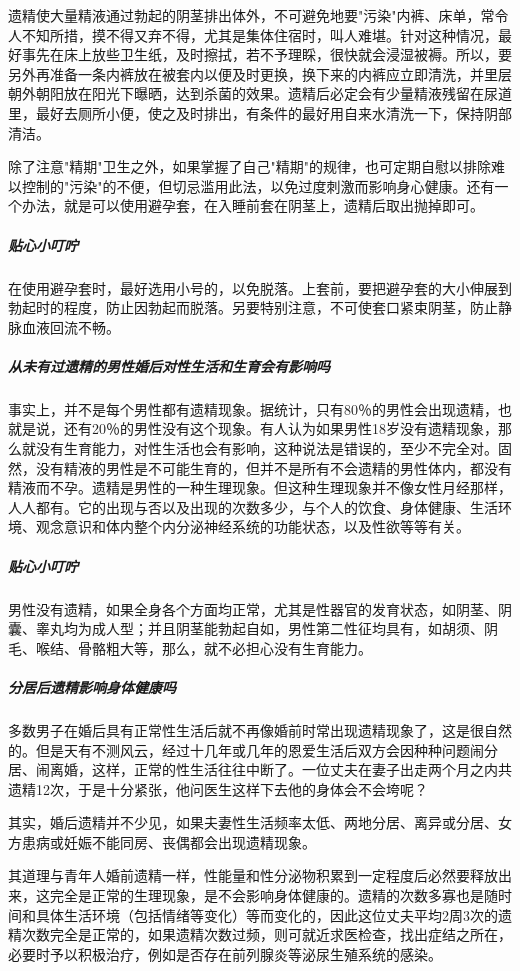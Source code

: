 遗精使大量精液通过勃起的阴茎排出体外，不可避免地要"污染"内裤、床单，常令人不知所措，摸不得又弃不得，尤其是集体住宿时，叫人难堪。针对这种情况，最好事先在床上放些卫生纸，及时擦拭，若不予理睬，很快就会浸湿被褥。所以，要另外再准备一条内裤放在被套内以便及时更换，换下来的内裤应立即清洗，并里层朝外朝阳放在阳光下曝晒，达到杀菌的效果。遗精后必定会有少量精液残留在尿道里，最好去厕所小便，使之及时排出，有条件的最好用自来水清洗一下，保持阴部清洁。

除了注意"精期"卫生之外，如果掌握了自己"精期"的规律，也可定期自慰以排除难以控制的"污染"的不便，但切忌滥用此法，以免过度刺激而影响身心健康。还有一个办法，就是可以使用避孕套，在入睡前套在阴茎上，遗精后取出抛掉即可。

\subparagraph{贴心小叮咛}

在使用避孕套时，最好选用小号的，以免脱落。上套前，要把避孕套的大小伸展到勃起时的程度，防止因勃起而脱落。另要特别注意，不可使套口紧束阴茎，防止静脉血液回流不畅。

\subparagraph{从未有过遗精的男性婚后对性生活和生育会有影响吗}

事实上，并不是每个男性都有遗精现象。据统计，只有80％的男性会出现遗精，也就是说，还有20％的男性没有这个现象。有人认为如果男性18岁没有遗精现象，那么就没有生育能力，对性生活也会有影响，这种说法是错误的，至少不完全对。固然，没有精液的男性是不可能生育的，但并不是所有不会遗精的男性体内，都没有精液而不孕。遗精是男性的一种生理现象。但这种生理现象并不像女性月经那样，人人都有。它的出现与否以及出现的次数多少，与个人的饮食、身体健康、生活环境、观念意识和体内整个内分泌神经系统的功能状态，以及性欲等等有关。

\subparagraph{贴心小叮咛}

男性没有遗精，如果全身各个方面均正常，尤其是性器官的发育状态，如阴茎、阴囊、睾丸均为成人型；并且阴茎能勃起自如，男性第二性征均具有，如胡须、阴毛、喉结、骨骼粗大等，那么，就不必担心没有生育能力。

\subparagraph{分居后遗精影响身体健康吗}

多数男子在婚后具有正常性生活后就不再像婚前时常出现遗精现象了，这是很自然的。但是天有不测风云，经过十几年或几年的恩爱生活后双方会因种种问题闹分居、闹离婚，这样，正常的性生活往往中断了。一位丈夫在妻子出走两个月之内共遗精12次，于是十分紧张，他问医生这样下去他的身体会不会垮呢？

其实，婚后遗精并不少见，如果夫妻性生活频率太低、两地分居、离异或分居、女方患病或妊娠不能同房、丧偶都会出现遗精现象。

其道理与青年人婚前遗精一样，性能量和性分泌物积累到一定程度后必然要释放出来，这完全是正常的生理现象，是不会影响身体健康的。遗精的次数多寡也是随时间和具体生活环境（包括情绪等变化）等而变化的，因此这位丈夫平均2周3次的遗精次数完全是正常的，如果遗精次数过频，则可就近求医检查，找出症结之所在，必要时予以积极治疗，例如是否存在前列腺炎等泌尿生殖系统的感染。

